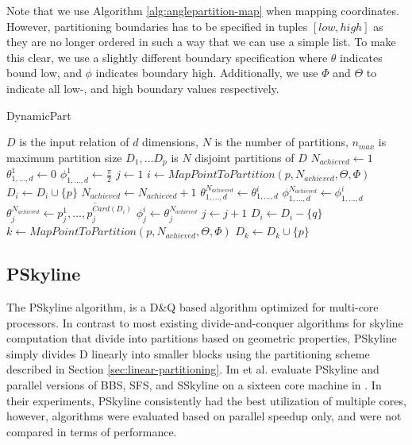 \documentclass[12pt,a4paper,twoside]{report}
\begin{document}
Note that we use Algorithm \ref{alg:anglepartition-map} when
mapping coordinates. However, partitioning boundaries has to be
specified in tuples $[low, high]$ as they are no longer ordered in
such a way that we can use a simple list. To make this clear, we
use a slightly different boundary specification where $\theta$
indicates bound low, and $\phi$ indicates boundary high.
Additionally, we use $\Phi$ and $\Theta$ to indicate all low-, and
high boundary values respectively.

\begin{algorithm}[H]
	\caption{DynamicPart}
	\label{alg:dynamic-partitioning}
	\begin{algorithmic}
		\Require 
			$D$ is the input relation of $d$ dimensions, 
			$N$ is the number of partitions,
			$n_{max}$ is maximum partition size
		\Ensure $D_1, \ldots D_p$ is $N$ disjoint partitions of $D$
		\State $N_{achieved} \leftarrow 1$
		\State $\theta_{1,\ldots,d}^1 \leftarrow 0$
		\State $\phi_{1,\ldots,d}^1 \leftarrow \frac{\pi}{2}$
		\State $j \leftarrow 1$
			\State $i \leftarrow MapPointToPartition(p,N_{achieved},\Theta,\Phi)$
			\State $D_i \leftarrow D_i \cup \{p\}$
				\State $N_{achieved} \leftarrow N_{achieved} + 1$
				\State $\theta_{1,\ldots,d}^{N_{achieved}} \leftarrow \theta_{1,\ldots,d}^{i}$
				\State $\phi_{1,\ldots,d}^{N_{achieved}} \leftarrow \phi_{1,\ldots,d}^i$
				\State $\theta_{j}^{N_{achieved}} \leftarrow \overline{p_j^1,\ldots,p_j^{Card(D_i)}}$
				\State $\phi_j^i \leftarrow \theta_{j}^{N_{achieved}}$
				\State $j \leftarrow j + 1$
					\State $D_i \leftarrow D_i - \{q\}$
					\State $k \leftarrow MapPointToPartition(p,N_{achieved},\Theta,\Phi)$
					\State $D_k \leftarrow D_k \cup \{p\}$
				\EndFor
			\EndIf
		\EndFor
	\end{algorithmic}
\end{algorithm}

\subsection{PSkyline}
\label{sec:pskyline}

The PSkyline algorithm, is a D\&Q based algorithm optimized for
multi-core processors. In contrast to most existing divide-and-conquer
algorithms for skyline computation that divide into partitions based
on geometric properties, PSkyline simply divides D linearly into
smaller blocks using the partitioning scheme described in Section
\ref{sec:linear-partitioning}. Im et al. evaluate PSkyline and
parallel versions of BBS, SFS, and SSkyline on a sixteen core machine
in \cite{park2009parallel}. In their experiments, PSkyline
consistently had the best utilization of multiple cores, however,
algorithms were evaluated based on parallel speedup only, and were not
compared in terms of performance.
\end{document}
